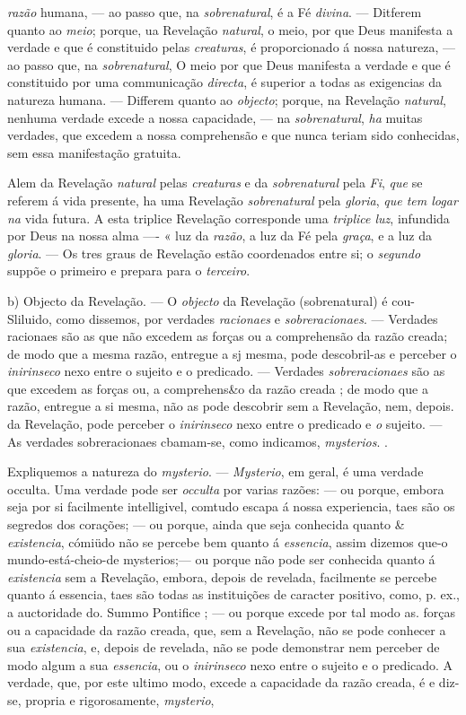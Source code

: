 \emph{razão} humana, --- ao passo que, na \emph{sobrenatural}, é a Fé \emph{divina}. --- Ditferem quanto ao \emph{meio}; porque, ua Revelação \emph{natural}, o meio, por que Deus manifesta a verdade e que é constituido pelas \emph{creaturas}, é proporcionado á nossa natureza, --- ao passo que, na \emph{sobrenatural}, O meio por que Deus manifesta a verdade e que é constituido por uma communicação \emph{directa}, é superior a todas as exigencias da natureza humana. --- Differem quanto ao \emph{objecto}; porque, na Revelação \emph{natural}, nenhuma verdade excede a nossa capacidade, --- na \emph{sobrenatural}, \emph{ha} muitas verdades, que excedem a nossa comprehensão e que nunca teriam sido conhecidas, sem essa manifestação gratuita.\par Alem da Revelação \emph{natural} pelas \emph{creaturas} e da \emph{sobrenatural} pela \emph{Fi}, \emph{que} se referem á vida presente, ha uma Revelação \emph{sobrenatural} pela \emph{gloria}, \emph{que tem logar na} vida futura. A esta triplice Revelação corresponde uma \emph{triplice luz}, infundida por Deus na nossa alma ---- « luz da \emph{razão}, a luz da Fé pela \emph{graça}, e a luz da \emph{gloria}. --- Os tres graus de Revelação estão coordenados entre si; o \emph{segundo} suppõe o primeiro e prepara para o \emph{terceiro}.\par b) Objecto da Revelação. --- O \emph{objecto} da Revelação (sobrenatural) é cou- Sliluido, como dissemos, por verdades \emph{racionaes} e \emph{sobreracionaes}. --- Verdades racionaes são as que não excedem as forças ou a comprehensão da razão creada; de modo que a mesma razão, entregue a sj mesma, pode descobril-as e perceber o \emph{inirinseco} nexo entre o sujeito e o predicado. --- Verdades \emph{sobreracionaes} são as que excedem as forças ou, a comprehens\&o da razão creada ; de modo que a razão, entregue a si mesma, não as pode descobrir sem a Revelação, nem, depois. da Revelação, pode perceber o \emph{inirinseco} nexo entre o predicado e \emph{o} sujeito. --- As verdades sobreracionaes cbamam-se, como indicamos, \emph{mysterios}. .\par Expliquemos a natureza do \emph{mysterio}. --- \emph{Mysterio}, em geral, é uma verdade occulta. Uma verdade pode ser \emph{occulta} por varias razões: --- ou porque, embora seja por si facilmente intelligivel, comtudo escapa á nossa experiencia, taes são os segredos dos corações; --- ou porque, ainda que seja conhecida quanto \& \emph{existencia}, cómiüdo não se percebe bem quanto á \emph{essencia}, assim dizemos que-o mundo-está-cheio-de mysterios;--- ou porque não pode ser conhecida quanto á \emph{existencia} sem a Revelação, embora, depois de revelada, facilmente se percebe quanto á essencia, taes são todas as instituições de caracter positivo, como, p. ex., a auctoridade do. Summo Pontifice ; --- ou porque excede por tal modo as. forças ou a capacidade da razão creada, que, sem a Revelação, não se pode conhecer a sua \emph{existencia}, e, depois de revelada, não se pode demonstrar nem perceber de modo algum a sua \emph{essencia}, ou o \emph{inirinseco} nexo entre o sujeito e o predicado. A verdade, que, por este ultimo modo, excede a capacidade da razão creada, é e diz-se, propria e rigorosamente, \emph{mysterio}, 